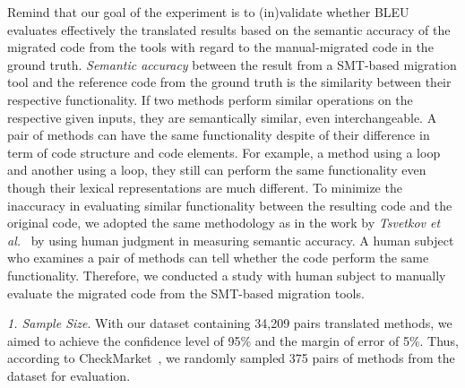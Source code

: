 %
Remind that our goal of the experiment is to (in)validate whether BLEU
evaluates effectively the translated results based on the semantic accuracy 
of the migrated code from the tools with regard to the manual-migrated code 
in the ground truth. 
%
{\em Semantic accuracy} between the result from a SMT-based migration
tool and the reference code from the ground truth is the similarity
between their respective functionality. 
%
If two methods perform similar operations on the respective given
inputs, they are semantically similar, even interchangeable. A pair of
methods can have the same functionality despite of their difference in
term of code structure and code elements.
%
For example, a method using a  loop and another using a
 loop, they still can perform the same functionality even
though their lexical representations are much different. 
%
%
To minimize the inaccuracy in evaluating similar functionality between
the resulting code and the original code, we adopted the same
methodology as in the work by {\em Tsvetkov et
  al.}~\cite{tsvetkov-acl15} by using human judgment in measuring
semantic accuracy.
%
A human subject who examines a pair of methods can tell whether the
code perform the same functionality.
%
Therefore, we conducted a study with human subject to manually
evaluate the migrated code from the SMT-based migration tools.


\emph{1. Sample Size}. 
%
With our dataset containing 34,209 pairs translated methods, we aimed
to achieve the confidence level of 95\% and the margin of error of
5\%. Thus, according to CheckMarket~\cite{sample}, we randomly sampled
375 pairs of methods from the dataset for evaluation.

